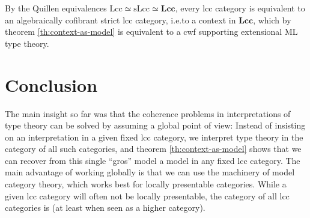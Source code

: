 \documentclass{article}
\theoremstyle{remark}
\theoremstyle{definition}
\begin{document}
By the Quillen equivalences $\mathrm{Lcc} \simeq \mathrm{sLcc} \simeq \mathbf{Lcc}$, every lcc category is equivalent to an algebraically cofibrant strict lcc category, i.e.\@ to a context in $\mathbf{Lcc}$, which by theorem \ref{th:context-as-model} is equivalent to a cwf supporting extensional ML type theory.

\section{Conclusion}

The main insight so far was that the coherence problems in interpretations of type theory can be solved by assuming a global point of view:
Instead of insisting on an interpretation in a given fixed lcc category, we interpret type theory in the category of all such categories, and theorem \ref{th:context-as-model} shows that we can recover from this single ``gros'' model a model in any fixed lcc category.
The main advantage of working globally is that we can use the machinery of model category theory, which works best for locally presentable categories.
While a given lcc category will often not be locally presentable, the category of all lcc categories is (at least when seen as a higher category).




\end{document}
